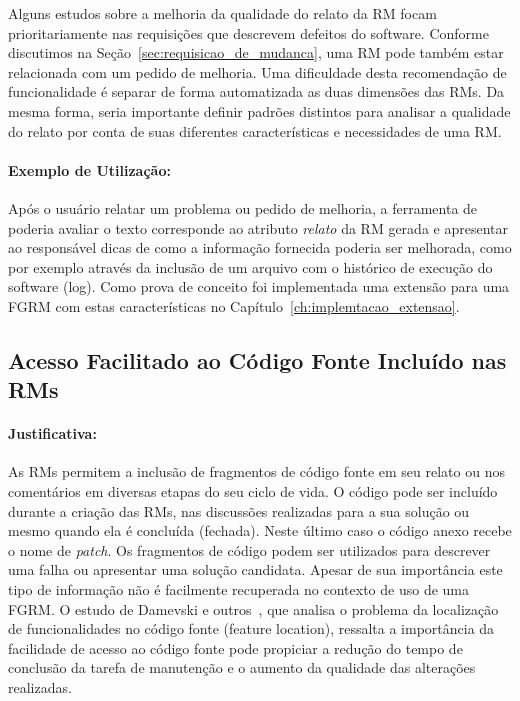 Alguns estudos sobre a melhoria da qualidade do relato da RM focam
prioritariamente nas requisições que descrevem defeitos do software. Conforme
discutimos na Seção~\ref{sec:requisicao_de_mudanca}, uma RM pode também estar
relacionada com um pedido de melhoria. Uma dificuldade desta recomendação de
funcionalidade é separar de forma automatizada as duas dimensões das RMs. Da
mesma forma, seria importante definir padrões distintos para analisar a
qualidade do relato por conta de suas diferentes características e necessidades
de uma RM\@.

\paragraph{Exemplo de Utilização:}
\label{par:exemplo_s01}

Após o usuário relatar um problema ou pedido de melhoria, a ferramenta de
poderia avaliar o texto corresponde ao atributo \textit{relato} da RM gerada e
apresentar ao responsável dicas de como a informação fornecida poderia ser
melhorada, como por exemplo através da inclusão de um arquivo com o histórico de
execução do software (log). Como prova de conceito foi implementada uma extensão
para uma FGRM com estas características no
Capítulo~\ref{ch:implemtacao_extensao}.

\subsection{Acesso Facilitado ao Código Fonte Incluído nas RMs}
\label{sub:busca_por_código_fonte}


\paragraph{Justificativa:}
\label{par:justificativa_s02}

As RMs permitem a inclusão de fragmentos de código fonte em seu relato ou nos
comentários em diversas etapas do seu ciclo de vida. O código pode ser incluído
durante a criação das RMs, nas discussões realizadas para a sua solução ou mesmo
quando ela é concluída (fechada). Neste último caso o código anexo recebe o nome
de \textit{patch}. Os fragmentos de código podem ser utilizados para descrever
uma falha ou apresentar uma solução candidata. Apesar de sua importância este
tipo de informação não é facilmente recuperada no contexto de uso de uma FGRM\@.
O estudo de Damevski e outros~\cite{damevski2016field}, que analisa o problema
da localização de funcionalidades no código fonte (feature location), ressalta a
importância da facilidade de acesso ao código fonte pode propiciar a redução do
tempo de conclusão da tarefa de manutenção e o aumento da qualidade das
alterações realizadas.

